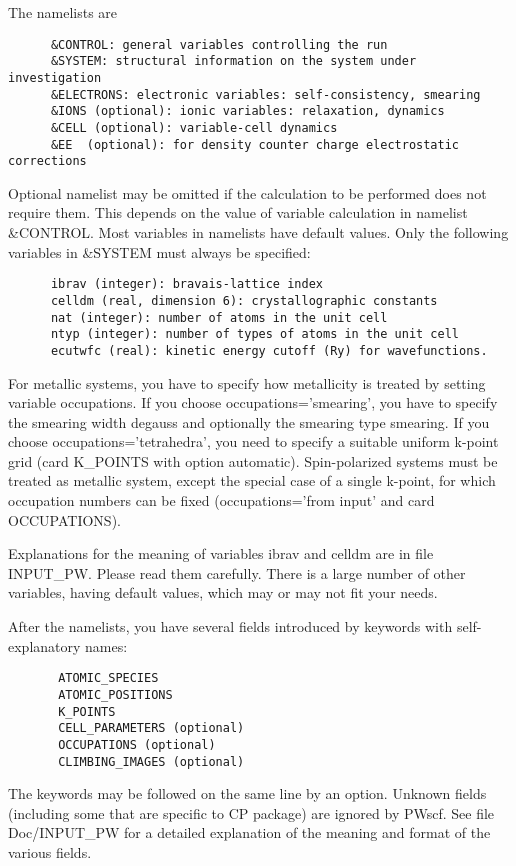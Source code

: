 \documentclass[12pt,a4paper]{article}
\begin{document}
The namelists are
\begin{verbatim}
      &CONTROL: general variables controlling the run
      &SYSTEM: structural information on the system under investigation
      &ELECTRONS: electronic variables: self-consistency, smearing
      &IONS (optional): ionic variables: relaxation, dynamics
      &CELL (optional): variable-cell dynamics
      &EE  (optional): for density counter charge electrostatic corrections
\end{verbatim}    
Optional namelist may be omitted if the calculation to be performed
does not require them. This depends on the value of variable calculation
in namelist \&CONTROL. Most variables in namelists have default values. Only
the following variables in \&SYSTEM must always be specified:
\begin{verbatim}
      ibrav (integer): bravais-lattice index
      celldm (real, dimension 6): crystallographic constants
      nat (integer): number of atoms in the unit cell
      ntyp (integer): number of types of atoms in the unit cell
      ecutwfc (real): kinetic energy cutoff (Ry) for wavefunctions.
\end{verbatim}    
For metallic systems, you have to specify how metallicity is treated
by setting 
variable occupations. If you choose occupations='smearing', you have
to specify the smearing width degauss and optionally the smearing type
smearing. If you choose occupations='tetrahedra', you need to specify 
a suitable uniform k-point grid (card K\_POINTS with option automatic).
Spin-polarized systems must be treated as metallic system, except the 
special case of a single k-point, for which occupation numbers can be fixed
(occupations='from input' and card OCCUPATIONS).
    
Explanations for the meaning of variables ibrav and celldm are in file
INPUT\_PW. Please read them carefully. There is a large number of other
variables, having default values, which may or may not fit your needs.
    
After the namelists, you have several fields introduced by keywords with
self-explanatory names:
\begin{verbatim}
       ATOMIC_SPECIES
       ATOMIC_POSITIONS
       K_POINTS
       CELL_PARAMETERS (optional)
       OCCUPATIONS (optional)
       CLIMBING_IMAGES (optional)
\end{verbatim}
The keywords may be followed on the same line by an option. Unknown
fields (including some that are specific to CP package) are ignored by PWscf.
See file Doc/INPUT\_PW for a detailed explanation of the meaning and format
of the various fields.
    
\end{document}
